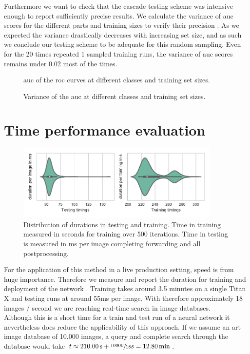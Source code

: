 Furthermore we want to check that the cascade testing scheme was intensive enough to report sufficiently precise results. We calculate the variance of \gls{auc} scores for the different parts and training sizes to verify their precision . As we expected the variance drastically decreases with increasing set size, and as such we conclude our testing scheme to be adequate for this random sampling. Even for the 20 times repeated 1 sampled training runs, the variance of \gls{auc} scores remains under 0.02 most of the times.
\begin{figure}[p!h]
    \centering
    
	\caption{\gls{auc} of the \gls{roc} curves at different classes and training set sizes.}
    \label{fig:auc_heatmap}
\end{figure}
\begin{figure}[p!h]
    \centering
    
	\caption{Variance of the \gls{auc} at different classes and training set sizes.}
    \label{fig:auc_var_heatmap}
\end{figure}

\section{Time performance evaluation}
\label{sec:results:time}
\begin{figure}[h!]
  \centering
  \includegraphics[width=0.9\textwidth]{figures/timings_fig}
  \caption{Distribution of durations in testing and training. Time in training measured in seconds for training over 500 iterations. Time in testing is measured in ms per image completing forwarding and all postprocessing.}
  \label{fig:timings}
\end{figure}
For the application of this method in a live production setting, speed is from huge importance. Therefore we measure and report the duration for training and deployment of the network . Training takes around 3.5 minutes on a single Titan X and testing runs at around 55ms per image. With therefore approximately 18 images / second we are reaching real-time search in image databases.\\
Although this is a short time for a train and test run of a neural network it  nevertheless does reduce the applicability of this approach. If we assume an art image database of 10.000 images, a query and complete search through the database would take $t \approx \SI{210}{\second} + \sfrac{10000}{18}s = \SI{12.8}{\minute}$.

